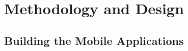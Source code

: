 \documentclass[12pt,a4paper]{article}  %
\begin{document}






\section{Methodology and Design}


\subsection{Building the Mobile Applications}
\end{document}
